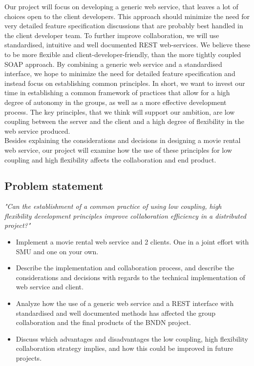 \documentclass[10pt,a4paper]{article}
\begin{document}
Our project will focus on developing a generic web service, that leaves a lot of choices open to the client developers. This approach should minimize the need for very detailed feature specification discussions that are probably best handled in the client developer team. To further improve collaboration, we will use standardised, intuitive and well documented REST web-services. We believe these to be more flexible and client-developer-friendly, than the more tightly coupled SOAP approach. By combining a generic web service and a standardised interface, we hope to minimize the need for detailed feature specification and instead focus on establishing common principles. In short, we want to invest our time in establishing a common framework of practices that allow for a high degree of autonomy in the groups, as well as a more effective development process. The key principles, that we think will support our ambition, are low coupling between the server and the client and a high degree of flexibility in the web service produced. \\

Besides explaining the considerations and decisions in designing a movie rental web service, our project will examine how the use of these principles for low coupling and high flexibility affects the collaboration and end product.

\subsection{Problem statement}
\emph{"Can the establishment of a common practice of using low coupling, high flexibility development principles improve collaboration efficiency in a distributed project?"}

\begin{itemize}
	\item Implement a movie rental web service and 2 clients. One in a joint effort with SMU and one on your own. 
	\item Describe the implementation and collaboration process, and describe the considerations and decisions with regards to the technical implementation of web service and client.
	\item Analyze how the use of a generic web service and a REST interface with standardised and well documented methods has affected the group collaboration and the final products of the BNDN project.
	\item Discuss which advantages and disadvantages the low coupling, high flexibility collaboration strategy implies, and how this could be improved in future projects.
\end{itemize}
\end{document}
